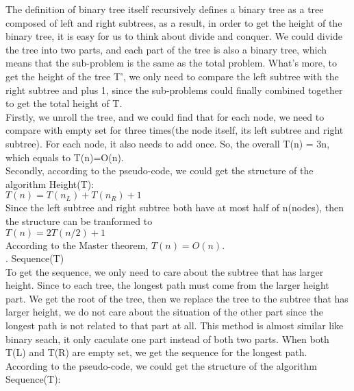 \documentclass[]{article}
\begin{document}
	\noindent The definition of binary tree itself recursively defines a binary tree as a tree composed of left and right subtrees, as a result, in order to get the height of the binary tree, it is easy for us to think about divide and conquer. We could divide the tree into two parts, and each part of the tree is also a binary tree, which means that the sub-problem is the same as the total problem. What's more, to get the height of the tree T', we only need to compare the left subtree with the right subtree and plus 1, since the sub-problems could finally combined together to get the total height of T.  \\
	
	\noindent Firstly, we unroll the tree, and we could find that for each node, we need to compare with empty set for three times(the node itself, its left subtree and right subtree). For each node, it also needs to add once. So, the overall T(n) = 3n, which equals to T(n)=O(n).  \\
	
	\noindent Secondly, according to the pseudo-code, we could get the structure of the algorithm Height(T): \\
	
	 $T(n) = T(n_{L}) + T(n_{R}) + 1$  \\
	 
	\noindent Since the left subtree and right subtree both have at most half of n(nodes), then the structure can be tranformed to\\
	
	$T(n) = 2 T(n/2) + 1$  \\
	
	\noindent According to the Master theorem, $T(n)=O(n)$.  \\
	
	. Sequence(T)   \\
	
	\noindent To get the sequence, we only need to care about the subtree that has larger height. Since to each tree, the longest path must come from the larger height part. We get the root of the tree, then we replace the tree to the subtree that has larger height, we do not care about the situation of the other part since the longest path is not related to that part at all. This method is almost similar like binary seach, it only caculate one part instead of both two parts. When both T(L) and T(R) are empty set,  we get the sequence for the longest path.\\
	
	\noindent According to the pseudo-code,  we could get the structure of the algorithm Sequence(T): \\
	
\end{document}
